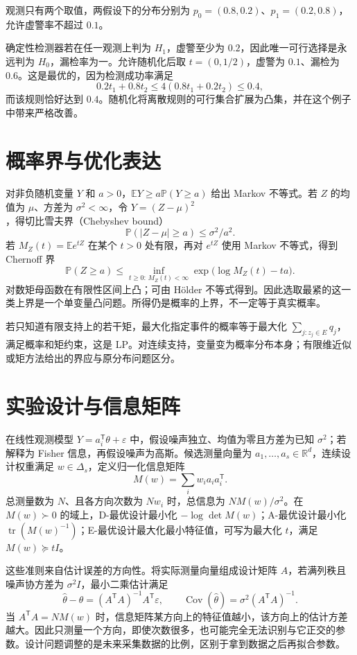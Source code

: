 \begin{example}[随机化为什么会改善检测器]
观测只有两个取值，两假设下的分布分别为 $p_0=(0.8,0.2)$、$p_1=(0.2,0.8)$，允许虚警率不超过 $0.1$。
\end{example}
\begin{solve}
确定性检测器若在任一观测上判为 $H_1$，虚警至少为 $0.2$，因此唯一可行选择是永远判为 $H_0$，漏检率为一。允许随机化后取 $t=(0,1/2)$，虚警为 $0.1$、漏检为 $0.6$。这是最优的，因为检测成功率满足
\[
 0.2t_1+0.8t_2\leq4(0.8t_1+0.2t_2)\leq0.4,
\]
而该规则恰好达到 $0.4$。随机化将离散规则的可行集合扩展为凸集，并在这个例子中带来严格改善。
\end{solve}

\section{概率界与优化表达}

对非负随机变量 $Y$ 和 $a>0$，$\mathbb EY\geq a\mathbb P(Y\geq a)$ 给出 Markov 不等式。若 $Z$ 的均值为 $\mu$、方差为 $\sigma^2<\infty$，令 $Y=(Z-\mu)^2$，得切比雪夫界（Chebyshev bound）
\[
 \mathbb P(|Z-\mu|\geq a)\leq\sigma^2/a^2.
\]
若 $M_Z(t)=\mathbb E e^{tZ}$ 在某个 $t>0$ 处有限，再对 $e^{tZ}$ 使用 Markov 不等式，得到 Chernoff 界
\[
 \mathbb P(Z\geq a)\leq\inf_{t\geq0:\,M_Z(t)<\infty}
       \exp\bigl(\log M_Z(t)-ta\bigr).
\]
对数矩母函数在有限性区间上凸；可由 Hölder 不等式得到。因此选取最紧的这一类上界是一个单变量凸问题。所得仍是概率的上界，不一定等于真实概率。

若只知道有限支持上的若干矩，最大化指定事件的概率等于最大化 $\sum_{j:z_j\in E}q_j$，满足概率和矩约束，这是 LP。对连续支持，变量变为概率分布本身；有限维近似或矩方法给出的界应与原分布问题区分。

\section{实验设计与信息矩阵}

在线性观测模型 $Y=a_i^{\mathsf T}\theta+\varepsilon$ 中，假设噪声独立、均值为零且方差为已知 $\sigma^2$；若解释为 Fisher 信息，再假设噪声为高斯。候选测量向量为 $a_1,\ldots,a_s\in\mathbb R^d$，连续设计权重满足 $w\in\Delta_s$，定义归一化信息矩阵
\[
 M(w)=\sum_iw_i a_i a_i^{\mathsf T}.
\]
总测量数为 $N$、且各方向次数为 $Nw_i$ 时，总信息为 $NM(w)/\sigma^2$。在 $M(w)\succ0$ 的域上，D-最优设计最小化 $-\log\det M(w)$；A-最优设计最小化 $\operatorname{tr}(M(w)^{-1})$；E-最优设计最大化最小特征值，可写为最大化 $t$，满足 $M(w)\succeq tI$。

这些准则来自估计误差的方向性。将实际测量向量组成设计矩阵 $A$，若满列秩且噪声协方差为 $\sigma^2I$，最小二乘估计满足
\[
 \widehat\theta-\theta=(A^{\mathsf T}A)^{-1}A^{\mathsf T}\varepsilon,
 \qquad
 \operatorname{Cov}(\widehat\theta)=\sigma^2(A^{\mathsf T}A)^{-1}.
\]
当 $A^{\mathsf T}A=NM(w)$ 时，信息矩阵某方向上的特征值越小，该方向上的估计方差越大。因此只测量一个方向，即使次数很多，也可能完全无法识别与它正交的参数。设计问题调整的是未来采集数据的比例，区别于拿到数据之后再拟合参数。

